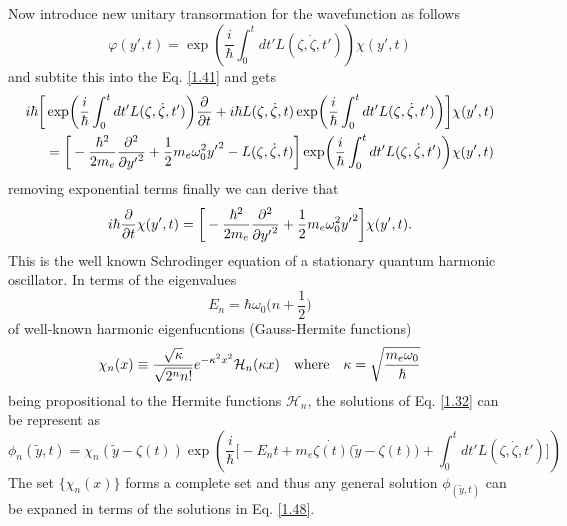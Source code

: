 \vspace{5mm}
\noindent
Now introduce new unitary transormation for the wavefunction as follows
\begin{equation} \label{1.43}
    \varphi(y',t) = \exp(\frac{i}{\hbar}\int_0^{t}dt'L(\zeta,\dot{\zeta},t')) \chi(y',t)
\end{equation}
and subtite this into the Eq. \eqref{1.41} and gets
\begin{equation} \label{1.44}
  \begin{aligned}
    i \hbar \bigg[
      & \exp(\frac{i}{\hbar}\int_0^{t}dt'L(\zeta,\dot{\zeta},t')) \pdv{t}
      +
      i \hbar L(\zeta,\dot{\zeta},t) \exp(\frac{i}{\hbar}\int_0^{t}dt'L(\zeta,\dot{\zeta},t'))
    \bigg]\chi(y',t) \\
    & =
    \bigg[
        -  \frac{\hbar^2}{2m_e}\pdv[2]{{y'}}
        + \frac{1}{2} m_e \omega_0^2 {y'}^2
        - L(\zeta,\dot{\zeta},t)
    \bigg] \exp(\frac{i}{\hbar}\int_0^{t}dt'L(\zeta,\dot{\zeta},t')) \chi(y',t)
  \end{aligned}
\end{equation}
removing exponential terms finally we can derive that
\begin{equation} \label{1.45}
  \begin{aligned}
    i \hbar \pdv{t} \chi(y',t)  =
    \bigg[
        -  \frac{\hbar^2}{2m_e}\pdv[2]{{y'}}
        + \frac{1}{2} m_e \omega_0^2 {y'}^2
    \bigg] \chi(y',t).
  \end{aligned}
\end{equation}
This is the well known Schrodinger equation of a stationary quantum harmonic oscillator.
In terms of the eigenvalues
\begin{equation} \label{1.46}
  E_n = \hbar \omega_0 \big(n + \frac{1}{2}\big)
\end{equation}
of well-known harmonic eigenfucntions (Gauss-Hermite functions)
\begin{equation} \label{1.47}
  \chi_n(x) \equiv \frac{\sqrt{\kappa}}{\sqrt{2^{n}n!}}
  e^{-\kappa^2 x^2}
  \mathcal{H}_n \qty(\kappa x) \quad \text{where}
  \quad
  \kappa = \sqrt{\frac{m_e \omega_0}{\hbar}}
\end{equation}
being propositional to the Hermite functions $\mathcal{H}_n$, the solutions of Eq. \eqref{1.32} can be represent as
\begin{equation} \label{1.48}
  \phi_n(\tilde{y},t) = \chi_n(\tilde{y} - \zeta(t))
  \exp(\frac{i}{\hbar}\bigg[- E_nt +
  m_e\dot{\zeta(t)}\big(\tilde{y}-\zeta(t)\big)
   + \int_0^{t}dt'L(\zeta,\dot{\zeta},t')\bigg])
\end{equation}
The set $\{\chi_n(x)\}$ forms a complete set and thus any general solution $\phi_(\tilde{y},t)$ can be expaned in terms of the solutions in Eq. \eqref{1.48}.

